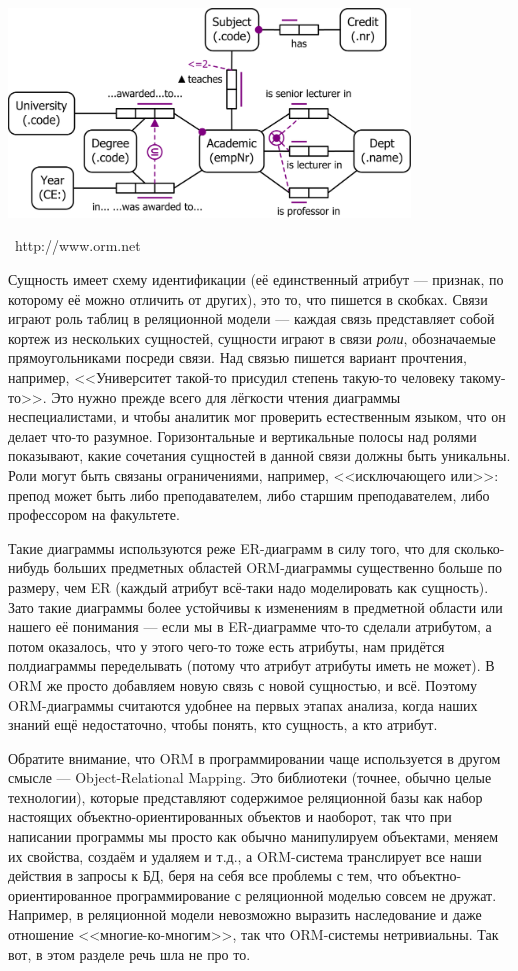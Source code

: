 \documentclass[a5paper]{article}
\newcommand{\attribution}[1] {
    \vspace{-4mm}\begin{flushright}\begin{scriptsize}%
    {\textcopyright\, #1}\end{scriptsize}\end{flushright}
}
\begin{document}
\begin{center}
    \includegraphics[width=0.8\textwidth]{orm.png}
    \attribution{http://www.orm.net}
\end{center}

Сущность имеет схему идентификации (её единственный атрибут --- признак, по которому её можно отличить от других), это то, что пишется в скобках. Связи играют роль таблиц в реляционной модели --- каждая связь представляет собой кортеж из нескольких сущностей, сущности играют в связи \textit{роли}, обозначаемые прямоугольниками посреди связи. Над связью пишется вариант прочтения, например, <<Университет такой-то присудил степень такую-то человеку такому-то>>. Это нужно прежде всего для лёгкости чтения диаграммы неспециалистами, и чтобы аналитик мог проверить естественным языком, что он делает что-то разумное. Горизонтальные и вертикальные полосы над ролями показывают, какие сочетания сущностей в данной связи должны быть уникальны. Роли могут быть связаны ограничениями, например, <<исключающего или>>: препод может быть либо преподавателем, либо старшим преподавателем, либо профессором на факультете.

Такие диаграммы используются реже ER-диаграмм в силу того, что для сколько-нибудь больших предметных областей ORM-диаграммы существенно больше по размеру, чем ER (каждый атрибут всё-таки надо моделировать как сущность). Зато такие диаграммы более устойчивы к изменениям в предметной области или нашего её понимания --- если мы в ER-диаграмме что-то сделали атрибутом, а потом оказалось, что у этого чего-то тоже есть атрибуты, нам придётся полдиаграммы переделывать (потому что атрибут атрибуты иметь не может). В ORM же просто добавляем новую связь с новой сущностью, и всё. Поэтому ORM-диаграммы считаются удобнее на первых этапах анализа, когда наших знаний ещё недостаточно, чтобы понять, кто сущность, а кто атрибут.

Обратите внимание, что ORM в программировании чаще используется в другом смысле --- Object-Relational Mapping. Это библиотеки (точнее, обычно целые технологии), которые представляют содержимое реляционной базы как набор настоящих объектно-ориентированных объектов и наоборот, так что при написании программы мы просто как обычно манипулируем объектами, меняем их свойства, создаём и удаляем и т.д., а ORM-система транслирует все наши действия в запросы к БД, беря на себя все проблемы с тем, что объектно-ориентированное программирование с реляционной моделью совсем не дружат. Например, в реляционной модели невозможно выразить наследование и даже отношение <<многие-ко-многим>>, так что ORM-системы нетривиальны. Так вот, в этом разделе речь шла не про то.
\end{document}
